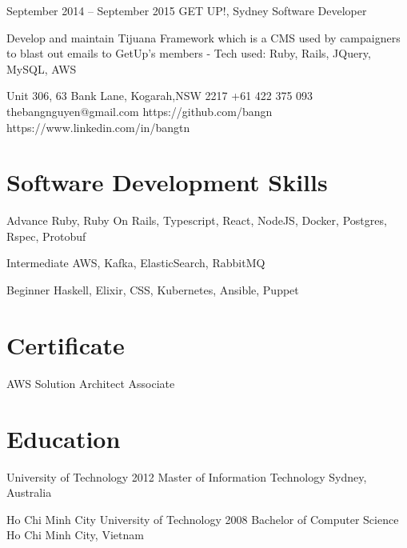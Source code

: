 \documentclass{tccv}
\begin{document}
\begin{eventlist}
\item{September 2014 -- September 2015}
    {GET UP!, Sydney}
    {Software Developer}

    Develop and maintain Tijuana Framework which is a CMS
    used by campaigners to blast out emails to GetUp's members
    \newline- Tech used: Ruby, Rails, JQuery, MySQL, AWS

\end{eventlist}

\personal
    {Unit 306, 63 Bank Lane, Kogarah,\newline NSW 2217}
    {+61 422 375 093}
    {thebangnguyen@gmail.com}
    {https://github.com/bangn}
    {https://www.linkedin.com/in/bangtn}

\section{Software Development Skills}

\begin{factlist}

\item{Advance}
    {Ruby, Ruby On Rails, Typescript, React, NodeJS, Docker, Postgres, Rspec, Protobuf}

\item{Intermediate}
    {AWS, Kafka, ElasticSearch, RabbitMQ}

\item{Beginner}
    {Haskell, Elixir, CSS, Kubernetes, Ansible, Puppet}
\end{factlist}

\section{Certificate}

\begin{factlist}

\item{AWS Solution Architect}
    {Associate}

\end{factlist}

\section{Education}
\begin{yearlist}

\item[University of Technology]{2012}
    {Master of Information Technology}
    {Sydney, Australia}

\item[Ho Chi Minh City University of Technology]{2008}
    {Bachelor of Computer Science}
    {Ho Chi Minh City, Vietnam}

\end{yearlist}
\end{document}
